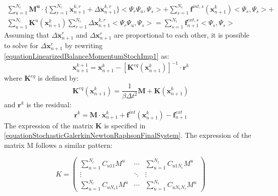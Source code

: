 \documentclass[oneside,11pt,times]{book}
\begin{document}
\begin{multline}\label{equationLinearizedBalanceMomentumStochImp1}
 \sum\limits_{u=1}^{N_{\epsilon}}\bm{M^{u}} \cdot \{\sum\limits_{r=1}^{N_{\epsilon}}\ddot{\bm{x}}^{k,r}_{n+1} + \Delta \ddot{\bm{x}}^{k,r}_{n+1}\}<\Psi_r\Psi_u,\Psi_s> + \sum\limits_{s=1}^{N_{\epsilon}}\bm{f}^{int,s}
 (\bm{x}^{k}_{n+1})<\Psi_s,\Psi_s> + \\ \sum\limits_{u=1}^{N_{\epsilon}}\bm{K}^{u}(\bm{x}^{k}_{n+1})
 \sum\limits_{r=1}^{N_{\epsilon}}\Delta \bm{x}^{k,r}_{n+1}<\Psi_r\Psi_u,\Psi_s>  = \sum\limits_{s=1}^{N_{\epsilon}}\bm{f}^{ext,s}_{n+1}<\Psi_s,\Psi_s>
 \end{multline}
Assuming that $\Delta \ddot{\bm{x}}^{r}_{n+1}$ and $\Delta {\bm{x}}^{r}_{n+1}$ are proportional to each other, it is possible to solve for $\Delta {\bm{x}}^{r}_{n+1}$ by rewriting  \eqref{equationLinearizedBalanceMomentumStochImp1} as:
\begin{equation} \label{equationUpdatedPosition}
 \bm{x}^{k+1}_{n+1} = \bm{x}^{k}_{n+1} - [\bm{K}^{eq}(\bm{x}^{k}_{n+1})]^{-1} \cdot \bm{r}^{k}
\end{equation}
where $\bm{K}^{eq}$ is defined by:
\begin{equation} \label{equationJacobianMatrix}
 \bm{K}^{eq}(\bm{x}^{k}_{n+1}) = \frac{1}{\beta \Delta t^2} \bm{M} + \bm{K} (\bm{x}^{k}_{n+1})
\end{equation}
and $\bm{r}^{k}$ is the residual:
\begin{equation} \label{equationResidualMomentum}
 \bm{r}^{k} = \bm{M} \cdot \ddot{\bm{x}}^{k}_{n+1} + \bm{f}^{int}(\bm{x}^{k}_{n+1}) -
 \bm{f}^{ext}_{n+1}
\end{equation}
The expression of the matrix $\bm{K}$ is specified in \eqref{equationStochasticGalerkinNewtonRaphsonFinalSystem}. The expression of the matrix M follows a similar pattern:

\begin{equation}
\label{equationMassStoch}
K = \begin{pmatrix}
    \sum\limits_{u=1}^{N_{\epsilon}} C_{u11} {M}^{u}     & \cdots & \sum\limits_{u=1}^{N_{\epsilon}} C_{u1N_{\epsilon}} {M}^{u} \\
    \vdots & \ddots & \vdots \\
    \sum\limits_{u=1}^{N_{\epsilon}} C_{uN_{\epsilon}1} {M}^{u}      & \cdots & \sum\limits_{u=1}^{N_{\epsilon}} C_{uN_{\epsilon}N_{\epsilon}} {M}^{u}
\end{pmatrix}
\end{equation}
\end{document}
